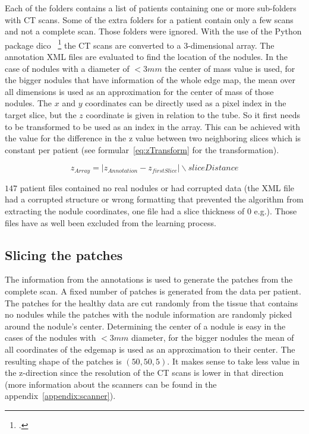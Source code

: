 \documentclass[../Thesis.tex]{subfiles}
\begin{document}
Each of the folders contains a list of patients containing one or more sub-folders with CT scans. Some of the extra folders for a patient contain only a few scans and not a complete scan. Those folders were ignored. With the use of the Python package dico~ \footcite{mason2011t} the CT scans are converted to a 3-dimensional array. The annotation XML files are evaluated to find the location of the nodules. In the case of nodules with a diameter of $<3mm$ the center of mass value is used, for the bigger nodules that have information of the whole edge map, the mean over all dimensions is used as an approximation for the center of mass of those nodules. The $x$ and $y$ coordinates can be directly used as a pixel index in the target slice, but the $z$ coordinate is given in relation to the tube. So it first needs to be transformed to be used as an index in the array. This can be achieved with the value for the difference in the z value between two neighboring slices which is constant per patient (see formular~\ref{eq:zTransform} for the transformation).

\begin{equation}
z_{Array} = |z_{Annotation} - z_{firstSlice}| \backslash sliceDistance
\label{eq:zTransform}
\end{equation}

$147$ patient files contained no real nodules or had corrupted data (the XML file had a corrupted structure or wrong formatting that prevented the algorithm from extracting the nodule coordinates, one file had a slice thickness of $0$ e.g.). Those files have as well been excluded from the learning process.

\subsection{Slicing the patches}
The information from the annotations is used to generate the patches from the complete scan. A fixed number of patches is generated from the data per patient. The patches for the healthy data are cut randomly from the tissue that contains no nodules while the patches with the nodule information are randomly picked around the nodule's center. Determining the center of a nodule is easy in the cases of the nodules with $<3mm$ diameter, for the bigger nodules the mean of all coordinates of the edgemap is used as an approximation to their center. The resulting shape of the patches is $(50,50,5)$. It makes sense to take less value in the z-direction since the resolution of the CT scans is lower in that direction (more information about the scanners can be found in the appendix~\ref{appendix:scanner}).
\end{document}
